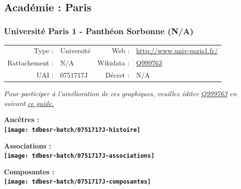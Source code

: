 \documentclass[12pt,french,]{article}
\begin{document}
\ifoddpage ~\newpage \fi   

\hypertarget{acaduxe9mie-paris}{%
\subsection{Académie : Paris}\label{acaduxe9mie-paris}}

\hypertarget{universituxe9-paris-1---panthuxe9on-sorbonne-na}{%
\subsubsection{Université Paris 1 - Panthéon Sorbonne
(N/A)}\label{universituxe9-paris-1---panthuxe9on-sorbonne-na}}

\begin{tabular*}{\textwidth}{rp{5cm}rl}  
\hline  
Type : & Université & Web : &\href{http://www.univ-paris1.fr/}{http://www.univ-paris1.fr/} \\  
Rattachement : & N/A & Wikidata : & \href{https://www.wikidata.org/entity/Q999763}{Q999763} \\  
UAI : & 0751717J & Décret : & N/A \\  
\hline  
\end{tabular*}

\textit{\scriptsize Pour participer à l'amélioration de ces graphiques, veuillez éditer  \href{https://www.wikidata.org/entity/Q999763}{Q999763}  en suivant \href{https://github.com/cpesr/wikidataESR/blob/master/Rmd/wikidataESR.md}{ce guide.}}

\vspace{1cm}  
\begin{minipage}[b]{0.50\textwidth}\begin{center} \bf Ancêtres : \\  
\texttt{[image: tdbesr-batch/0751717J-histoire]} \end{center}\end{minipage}\begin{minipage}[b]{0.50\textwidth}\begin{center} \bf Associations : \\  
\texttt{[image: tdbesr-batch/0751717J-associations]} \end{center}\end{minipage}

\hrulefill

\begin{center} \bf Composantes : \\  
\texttt{[image: tdbesr-batch/0751717J-composantes]} \end{center}
\end{document}
